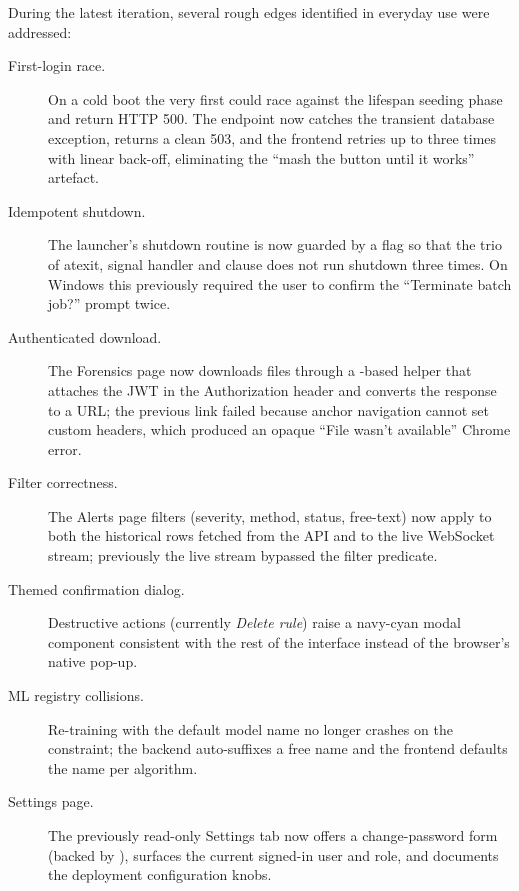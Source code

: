 During the latest iteration, several rough edges identified in everyday
use were addressed:
\begin{description}
    \item[First-login race.] On a cold boot the very first
         could race against the lifespan
        seeding phase and return HTTP 500. The endpoint now catches the
        transient database exception, returns a clean 503, and the
        frontend retries up to three times with linear back-off,
        eliminating the ``mash the button until it works'' artefact.
    \item[Idempotent shutdown.] The launcher's shutdown routine is now
        guarded by a flag so that the trio of atexit, signal handler
        and  clause does not run shutdown three times. On
        Windows this previously required the user to confirm the
        ``Terminate batch job?'' prompt twice.
    \item[Authenticated download.] The Forensics page now downloads
        files through a -based helper that attaches the JWT
        in the Authorization header and converts the response to a
         URL; the previous  link failed
        because anchor navigation cannot set custom headers, which
        produced an opaque ``File wasn't available'' Chrome error.
    \item[Filter correctness.] The Alerts page filters (severity,
        method, status, free-text) now apply to both the historical
        rows fetched from the API and to the live WebSocket stream;
        previously the live stream bypassed the filter predicate.
    \item[Themed confirmation dialog.] Destructive actions (currently
        \textit{Delete rule}) raise a navy-cyan modal component
        consistent with the rest of the interface instead of the
        browser's native pop-up.
    \item[ML registry collisions.] Re-training with the default model
        name no longer crashes on the  constraint; the
        backend auto-suffixes a free name and the frontend defaults the
        name per algorithm.
    \item[Settings page.] The previously read-only Settings tab now
        offers a change-password form (backed by
        ), surfaces the current
        signed-in user and role, and documents the deployment
        configuration knobs.
\end{description}

